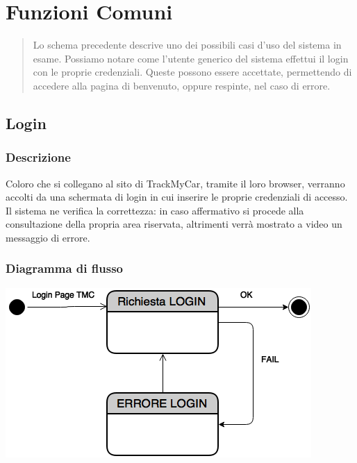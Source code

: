 \documentclass[a4paper,12pt]{article}
\begin{document}
\section{Funzioni Comuni}
\begin{center}
\end{center}

\begin{quotation}
Lo schema precedente descrive uno dei possibili casi d'uso del sistema in esame. Possiamo notare come l'utente generico del sistema effettui il login con le proprie credenziali. Queste possono essere accettate, permettendo di accedere alla pagina di benvenuto, oppure respinte, nel caso di errore.
\end{quotation}

\pagebreak

\subsection{Login}
\subsubsection{Descrizione}
Coloro che si collegano al sito di TrackMyCar, tramite il loro browser, verranno accolti da una schermata di login in cui inserire le proprie credenziali di accesso. Il sistema ne verifica la correttezza: in caso affermativo si procede alla consultazione della propria area riservata, altrimenti verrà mostrato a video un messaggio di errore.
\subsubsection{Diagramma di flusso}

\begin{center}
\includegraphics[scale=0.7]{Login.png}
\end{center}
\end{document}
